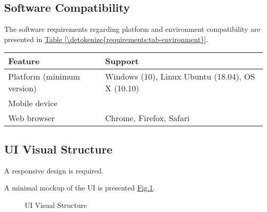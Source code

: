 \documentclass[letterpaper,10pt, openany,english]{sphinxmanual}
\begin{document}
\subsection{Software Compatibility}
\label{\detokenize{requirements:software-compatibility}}
The software requirements regarding platform and environment compatibility are presented in \hyperref[\detokenize{requirements:tab-environment}]{Table \ref{\detokenize{requirements:tab-environment}}}.


\begin{savenotes}\sphinxattablestart
\centering
{}
\sphinxthecaptionisattop
{}\label{\detokenize{requirements:id18}}\label{\detokenize{requirements:tab-environment}}
\sphinxaftertopcaption
\begin{tabulary}{\linewidth}[t]{|T|T|}
\hline
\sphinxstyletheadfamily 
Feature
&\sphinxstyletheadfamily 
Support
\\
\hline
Platform (minimum version)
&
Windows (10), Linux Ubuntu (18.04), OS X (10.10)
\\
\hline
Mobile device
&
\\
\hline
Web browser
&
Chrome, Firefox, Safari
\\
\hline
\end{tabulary}
\par
\sphinxattableend\end{savenotes}


\subsection{UI Visual Structure}
\label{\detokenize{requirements:ui-visual-structure}}
A responsive design is required.

A minimal mockup of the UI is presented \hyperref[\detokenize{requirements:screen-mockup}]{Fig.\@ \ref{\detokenize{requirements:screen-mockup}}}.

\begin{figure}[htbp]
\centering
\capstart

\noindent{}
\caption{UI Visual Structure}\label{\detokenize{requirements:screen-mockup}}\end{figure}
\end{document}
